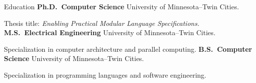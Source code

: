 \begin{rubric}{Education}
%
	\textbf{Ph.D.~Computer Science} University of Minnesota--Twin Cities.
	\par Thesis title: \emph{Enabling Practical Modular Language Specifications.}
% 
\entry*[2016 -- 2018]%
	\textbf{M.S.~Electrical Engineering} University of Minnesota--Twin Cities.
	\par Specialization in computer architecture and parallel computing.
%
\entry*[2011 -- 2015]%
	\textbf{B.S.~Computer Science} University of Minnesota--Twin Cities.
	\par Specialization in programming languages and software engineering.
\end{rubric}